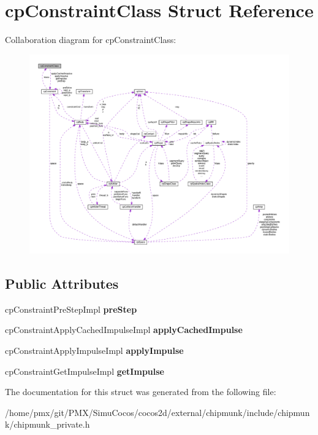 \hypertarget{structcpConstraintClass}{}\section{cp\+Constraint\+Class Struct Reference}
\label{structcpConstraintClass}


Collaboration diagram for cp\+Constraint\+Class\+:
\nopagebreak
\begin{figure}[H]
\begin{center}
\leavevmode
\includegraphics[width=350pt]{structcpConstraintClass__coll__graph}
\end{center}
\end{figure}
\subsection*{Public Attributes}
\begin{DoxyCompactItemize}
\item 
\mbox{\label{structcpConstraintClass_a0424d3d9d2ea5c12ad70fbbfc5400e64}} 
cp\+Constraint\+Pre\+Step\+Impl {\bfseries pre\+Step}
\item 
\mbox{\label{structcpConstraintClass_a63a5a24947dcc70b3a3c145efb765cdb}} 
cp\+Constraint\+Apply\+Cached\+Impulse\+Impl {\bfseries apply\+Cached\+Impulse}
\item 
\mbox{\label{structcpConstraintClass_aaf394b027a670164f6453a85dfa13eb4}} 
cp\+Constraint\+Apply\+Impulse\+Impl {\bfseries apply\+Impulse}
\item 
\mbox{\label{structcpConstraintClass_a3702fa721f9c2ccabf32eb81339fd8dc}} 
cp\+Constraint\+Get\+Impulse\+Impl {\bfseries get\+Impulse}
\end{DoxyCompactItemize}


The documentation for this struct was generated from the following file\+:\begin{DoxyCompactItemize}
\item 
/home/pmx/git/\+P\+M\+X/\+Simu\+Cocos/cocos2d/external/chipmunk/include/chipmunk/chipmunk\+\_\+private.\+h\end{DoxyCompactItemize}
